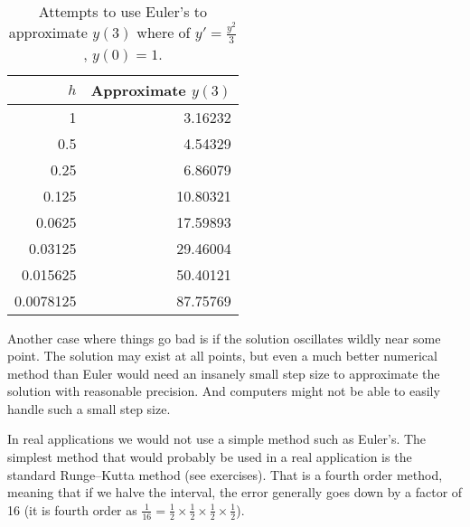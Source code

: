 \documentclass{ximera}
\begin{document}
\begin{table}[h!t]
    \mybeginframe
    \capstart
    \begin{center}
        \begin{tabular}{@{}rr@{}}
            \toprule
            $h$ & Approximate $y(3)$ \\
            \midrule
            1        & 3.16232 \\
            0.5      & 4.54329 \\
            0.25     & 6.86079 \\
            0.125    & 10.80321 \\
            0.0625   & 17.59893 \\
            0.03125  & 29.46004 \\
            0.015625 & 50.40121 \\
            0.0078125& 87.75769 \\
            \bottomrule
        \end{tabular}
    \end{center}
    \caption{Attempts to use Euler's to approximate $y(3)$ where of $y'=\frac{y^2}{3}$, $y(0)=1$.\label{euler-table2:table}}
    \myendframe
\end{table}

Another case where things go bad is if the solution oscillates wildly near some point.
The solution may exist at all points, but even a much better numerical method than Euler would need an insanely small step size to approximate the solution with reasonable precision. And computers might not be able to easily handle such a small step size.

\medskip

In real applications we would not use a simple method such as Euler's.  The simplest method that would probably be used in a real application is the standard Runge--Kutta method (see exercises).  That is a fourth order method, meaning that if we halve the interval, the error generally goes down by a factor of 16 (it is fourth order as $\frac{1}{16} = \frac{1}{2} \times \frac{1}{2} \times \frac{1}{2} \times \frac{1}{2}$).
\end{document}
